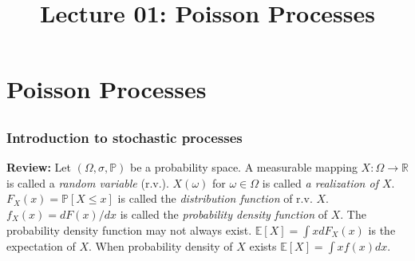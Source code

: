 \documentclass[all-lectures.tex]{subfiles}
\title{Lecture 01: Poisson Processes}
\author{}
\begin{document}

\chapter{Poisson Processes}
\setcounter{section}{1}
\setcounter{subsection}{0}
\section*{}
\subsection{Introduction to stochastic processes}

\indent \textbf{Review:} Let $(\Omega,\sigma,\mathbb{P})$ be a probability space. A measurable mapping $X:\Omega \to \mathbb{R}$ is called a \textit{random variable} (r.v.). $X(\omega)$ for $\omega \in \Omega$ is called \textit{a realization of $X$}. $F_X (x) = \mathbb{P}[X\leq x]$ is called the \textit{distribution function} of r.v. $X$. $f_X(x) = dF(x)/dx$ is called the \textit{probability density function} of $X$. The probability density function may not always exist. $\mathbb{E}[X] = \int x dF_X(x) $ is the expectation of $X$. When probability density of $X$ exists $\mathbb{E}[X] = \int xf(x)dx$.\\
\end{document}
